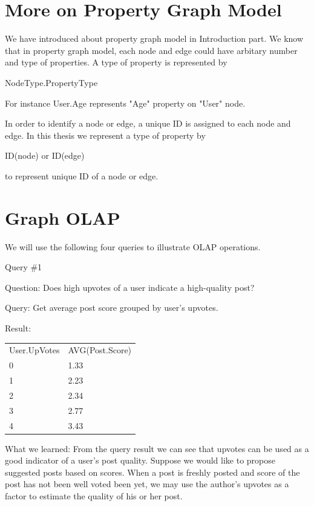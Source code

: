 \section{More on Property Graph Model}
We have introduced about property graph model in Introduction part. We know that in property graph model, each node and edge could have arbitary number and type of properties. A type of property is represented by 

NodeType.PropertyType

For instance User.Age represents "Age" property on "User" node.

In order to identify a node or edge, a unique ID is assigned to each node and edge.  In this thesis we represent a type of property by 

ID(node) or ID(edge)

to represent unique ID of a node or edge.

\section{Graph OLAP}

We will use the following four queries to illustrate OLAP operations.

Query \#1

Question: 	Does high upvotes of a user indicate a high-quality post?

Query: 		Get average post score grouped by user’s upvotes. 

Result:
\begin {center}
\begin{tabular}{ l l }  
	User.UpVotes&AVG(Post.Score)\\0&1.33\\1&2.23\\2&2.34\\3&2.77\\4&3.43\\
\end{tabular}
\end {center}



What we learned:	From the query result we can see that upvotes can be used as a good indicator of a user’s post quality. Suppose we would like to propose suggested posts based on scores. When a post is freshly posted and score of the post has not been well voted been yet, we may use the author’s upvotes as a factor to estimate the quality of his or her post.


